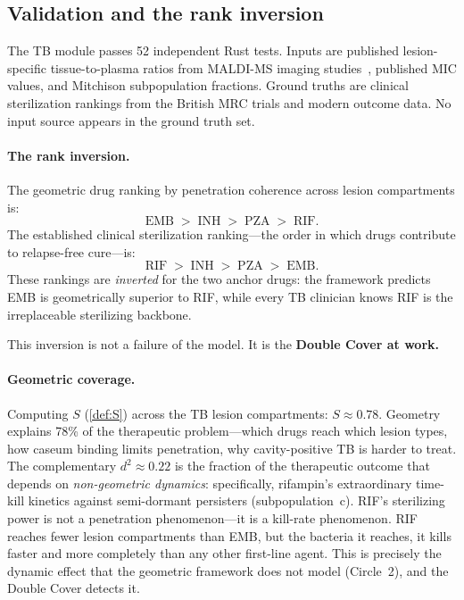 \documentclass[11pt]{article}
\theoremstyle{plain}
\theoremstyle{definition}
\begin{document}
\subsection{Validation and the rank inversion}
\label{sec:tb-validation}

The TB module passes 52 independent Rust tests. Inputs are
published lesion-specific tissue-to-plasma ratios from MALDI-MS
imaging studies~\cite{Prideaux2015, Kjellsson2012}, published
MIC values, and Mitchison subpopulation fractions. Ground truths
are clinical sterilization rankings from the British MRC trials
and modern outcome data. No input source appears in the ground
truth set.

\paragraph{The rank inversion.}
The geometric drug ranking by penetration coherence across lesion
compartments is:
\[
  \text{EMB} \;>\; \text{INH} \;>\; \text{PZA} \;>\; \text{RIF}.
\]
The established clinical sterilization ranking---the order in which
drugs contribute to relapse-free cure---is:
\[
  \text{RIF} \;>\; \text{INH} \;>\; \text{PZA} \;>\; \text{EMB}.
\]
These rankings are \emph{inverted} for the two anchor drugs: the
framework predicts EMB is geometrically superior to RIF, while
every TB clinician knows RIF is the irreplaceable sterilizing
backbone.

This inversion is not a failure of the model. It is the
\textbf{Double Cover at work.}

\paragraph{Geometric coverage.}
Computing $S$ (\cref{def:S}) across the TB lesion compartments:
$S \approx 0.78$. Geometry explains 78\% of the therapeutic
problem---which drugs reach which lesion types, how caseum binding
limits penetration, why cavity-positive TB is harder to treat.
The complementary $d^2 \approx 0.22$ is the fraction of the
therapeutic outcome that depends on \emph{non-geometric dynamics}:
specifically, rifampin's extraordinary time-kill kinetics against
semi-dormant persisters (subpopulation~c). RIF's sterilizing
power is not a penetration phenomenon---it is a kill-rate
phenomenon. RIF reaches fewer lesion compartments than EMB, but
the bacteria it reaches, it kills faster and more completely than
any other first-line agent. This is precisely the dynamic effect
that the geometric framework does not model (Circle~2), and the
Double Cover detects it.
\end{document}
